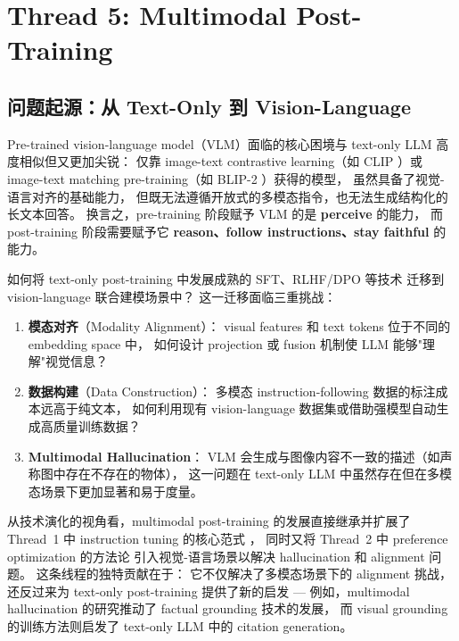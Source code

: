 \section{Thread 5: Multimodal Post-Training}
\label{sec:t5}

\subsection{问题起源：从 Text-Only 到 Vision-Language}
\label{sec:t5-origin}

Pre-trained vision-language model（VLM）面临的核心困境与 text-only LLM 高度相似但又更加尖锐：
仅靠 image-text contrastive learning（如 CLIP \cite{radford2021clip}）或
image-text matching pre-training（如 BLIP-2 \cite{li2023blip2}）获得的模型，
虽然具备了视觉-语言对齐的基础能力，
但既无法遵循开放式的多模态指令，也无法生成结构化的长文本回答。
换言之，pre-training 阶段赋予 VLM 的是 \textbf{perceive} 的能力，
而 post-training 阶段需要赋予它 \textbf{reason、follow instructions、stay faithful} 的能力。

\begin{problembox}
如何将 text-only post-training 中发展成熟的 SFT、RLHF/DPO 等技术
迁移到 vision-language 联合建模场景中？
这一迁移面临三重挑战：
\begin{enumerate}[leftmargin=2em]
  \item \textbf{模态对齐}（Modality Alignment）：
    visual features 和 text tokens 位于不同的 embedding space 中，
    如何设计 projection 或 fusion 机制使 LLM 能够"理解"视觉信息？
  \item \textbf{数据构建}（Data Construction）：
    多模态 instruction-following 数据的标注成本远高于纯文本，
    如何利用现有 vision-language 数据集或借助强模型自动生成高质量训练数据？
  \item \textbf{Multimodal Hallucination}：
    VLM 会生成与图像内容不一致的描述（如声称图中存在不存在的物体），
    这一问题在 text-only LLM 中虽然存在但在多模态场景下更加显著和易于度量。
\end{enumerate}
\end{problembox}

\noindent
从技术演化的视角看，multimodal post-training 的发展直接继承并扩展了
Thread~1 中 instruction tuning 的核心范式
，
同时又将 Thread~2 中 preference optimization 的方法论
引入视觉-语言场景以解决 hallucination 和 alignment 问题。
这条线程的独特贡献在于：
它不仅解决了多模态场景下的 alignment 挑战，
还反过来为 text-only post-training 提供了新的启发 ---
例如，multimodal hallucination 的研究推动了 factual grounding 技术的发展，
而 visual grounding 的训练方法则启发了 text-only LLM 中的 citation generation。

